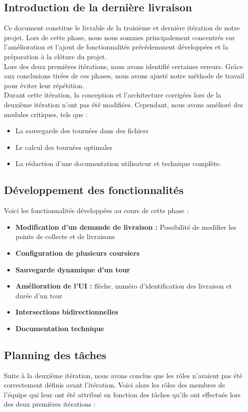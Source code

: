 \documentclass[a4paper]{article}
\begin{document}
\subsection{Introduction de la dernière livraison}
Ce document constitue le livrable de la troisième et dernière itération de notre projet. Lors de cette phase, nous nous sommes principalement concentrés sur l'amélioration et l'ajout de fonctionnalités précédemment développées et la préparation à la clôture du projet.\\
\newline
\indent Lors des deux premières itérations, nous avons identifié certaines erreurs. Grâce aux conclusions tirées de ces phases, nous avons ajusté notre méthode de travail pour éviter leur répétition.\\
\newline
\indent Durant cette itération, la conception et l'architecture corrigées lors de la deuxième itération n'ont pas été modifiées. Cependant, nous avons amélioré des modules critiques, tels que :
\begin{itemize}
    \item La sauvegarde des tournées dans des fichiers
    \item Le calcul des tournées optimales
    \item La rédaction d'une documentation utilisateur et technique complète.
\end{itemize}

\subsection{Développement des fonctionnalités}
Voici les fonctionnalités développées au cours de cette phase :
\begin{itemize}
    \item \textbf{Modification d'un demande de livraison :} Possibilité de modifier les points de collecte et de livraisons
    \item \textbf{Configuration de plusieurs coursiers} 
    \item \textbf{Sauvegarde dynamique d’un tour} 
    \item \textbf{Amélioration de l’UI :} flèche, numéro d’identification des livraison et durée d’un tour
    \item \textbf{Intersections bidirectionnelles}
    \item \textbf{Documentation technique}
\end{itemize}

\subsection{Planning des tâches}
Suite à la deuxième itération, nous avons conclus que les rôles n'avaient pas été correctement définis avant l'itération. Voici alors les rôles des membres de l'équipe qui leur ont été attribué en fonction des tâches qu'ils ont effectués lors des deux premières itérations :
\end{document}

